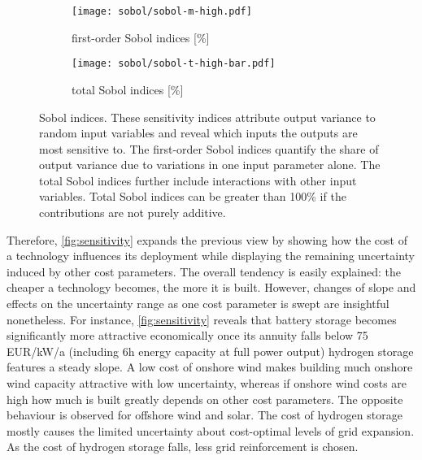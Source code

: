 \begin{figure}
    \begin{subfigure}[t]{0.45\textwidth}
        \caption{first-order Sobol indices [\%]}
        \label{fig:sobol:first}
        \texttt{[image: sobol/sobol-m-high.pdf]}
    \end{subfigure}
    \begin{subfigure}[t]{0.54\textwidth}
        \caption{total Sobol indices [\%]}
        \label{fig:sobol:total}
        \texttt{[image: sobol/sobol-t-high-bar.pdf]}
    \end{subfigure}
    \vspace{-0.3cm}
    \caption[First-order and total Sobol indices]{
      Sobol indices. These sensitivity indices attribute output variance to random input variables
      and reveal which inputs the outputs are most sensitive to. The first-order Sobol indices
      quantify the share of output variance due to variations in one input parameter alone.
      The total Sobol indices further include interactions with other input variables.
      Total Sobol indices can be greater than 100\% if the contributions are not purely additive.
    }
    \label{fig:sobol}
\end{figure}


Therefore, \cref{fig:sensitivity} expands the previous view by showing how the
cost of a technology influences its deployment while displaying the remaining
uncertainty induced by other cost parameters. The overall tendency is easily
explained: the cheaper a technology becomes, the more it is built. However,
changes of slope and effects on the uncertainty range as one cost parameter is
swept are insightful nonetheless. For instance, \cref{fig:sensitivity} reveals
that battery storage becomes significantly more attractive economically once its
annuity falls below 75 EUR/kW/a (including 6h energy capacity at full power
output) hydrogen storage features a steady slope. A low cost of onshore wind
makes building much onshore wind capacity attractive with low uncertainty,
whereas if onshore wind costs are high how much is built greatly depends on
other cost parameters. The opposite behaviour is observed for offshore wind and
solar. The cost of hydrogen storage mostly causes the limited uncertainty about
cost-optimal levels of grid expansion. As the cost of hydrogen storage falls,
less grid reinforcement is chosen.

